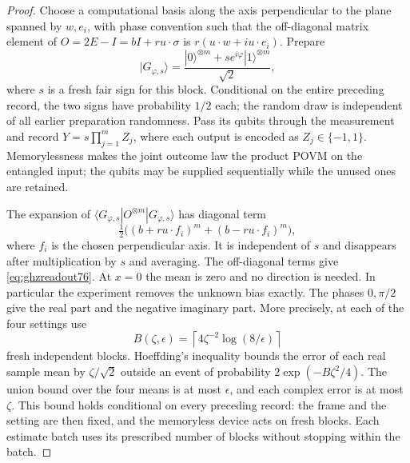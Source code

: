 \begin{proof}
Choose a computational basis along the axis perpendicular to the
plane spanned by $w,e_i$, with phase convention such that the
off-diagonal matrix element of
$O=2E-I=bI+ru\cdot\sigma$ is
$r(u\cdot w+i u\cdot e_i)$.  Prepare
\[
 |G_{\varphi,s}\rangle
       =\frac{|0\rangle^{\otimes m}
                    +s e^{i\varphi}|1\rangle^{\otimes m}}{\sqrt2},
\]
where $s$ is a fresh fair sign for this block.  Conditional on the
entire preceding record, the two signs have probability $1/2$ each;
the random draw is independent of all earlier preparation randomness.
Pass its qubits through the
measurement and record $Y=s\prod_{j=1}^m Z_j$, where each output
is encoded as $Z_j\in\{-1,1\}$.  Memorylessness makes the joint
outcome law the product POVM on the entangled input; the qubits may
be supplied sequentially while the unused ones are retained.

The expansion of $\langle G_{\varphi,s}|O^{\otimes m}
|G_{\varphi,s}\rangle$ has diagonal term
\[
 \tfrac12\bigl((b+ru\cdot f_i)^m+(b-ru\cdot f_i)^m\bigr),
\]
where $f_i$ is the chosen perpendicular axis.  It is independent
of $s$ and disappears after multiplication by $s$ and averaging.
The off-diagonal terms give \eqref{eq:ghzreadout76}.  At $x=0$
the mean is zero and no direction is needed.  In particular
the experiment removes the unknown bias exactly.  The phases
$0,\pi/2$ give the real part and the negative imaginary part.
More precisely, at each of the four settings use
\begin{equation}\label{eq:learnblockcount77}
 B(\zeta,\epsilon)
   =\left\lceil4\zeta^{-2}\log(8/\epsilon)\right\rceil
\end{equation}
fresh independent blocks.  Hoeffding's inequality bounds the error
of each real sample mean by $\zeta/\sqrt2$ outside an event of
probability $2\exp(-B\zeta^2/4)$.  The union bound over the four
means is at most $\epsilon$, and each complex error is at most
$\zeta$.  This bound holds conditional on every preceding record:
the frame and the setting are then fixed, and the memoryless device
acts on fresh blocks.  Each estimate batch uses its prescribed
number of blocks without stopping within the batch.


\end{proof}
